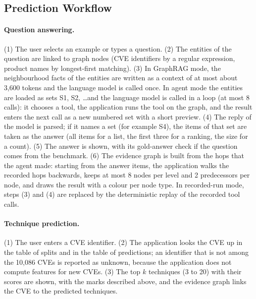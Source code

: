 \documentclass[12pt, a4paper]{article}
\begin{document}
\subsection{Prediction Workflow}
\paragraph{Question answering.} (1) The user selects an example or types a question. (2) The entities of the question are linked to graph nodes (CVE identifiers by a regular expression, product names by longest-first matching). (3) In GraphRAG mode, the neighbourhood facts of the entities are written as a context of at most about 3,600 tokens and the language model is called once. In agent mode the entities are loaded as sets S1, S2, \dots and the language model is called in a loop (at most 8 calls): it chooses a tool, the application runs the tool on the graph, and the result enters the next call as a new numbered set with a short preview. (4) The reply of the model is parsed; if it names a set (for example S4), the items of that set are taken as the answer (all items for a list, the first three for a ranking, the size for a count). (5) The answer is shown, with its gold-answer check if the question comes from the benchmark. (6) The evidence graph is built from the hops that the agent made: starting from the answer items, the application walks the recorded hops backwards, keeps at most 8 nodes per level and 2 predecessors per node, and draws the result with a colour per node type. In recorded-run mode, steps (3) and (4) are replaced by the deterministic replay of the recorded tool calls.

\paragraph{Technique prediction.} (1) The user enters a CVE identifier. (2) The application looks the CVE up in the table of splits and in the table of predictions; an identifier that is not among the 10,086 CVEs is reported as unknown, because the application does not compute features for new CVEs. (3) The top $k$ techniques (3 to 20) with their scores are shown, with the marks described above, and the evidence graph links the CVE to the predicted techniques.
\end{document}
